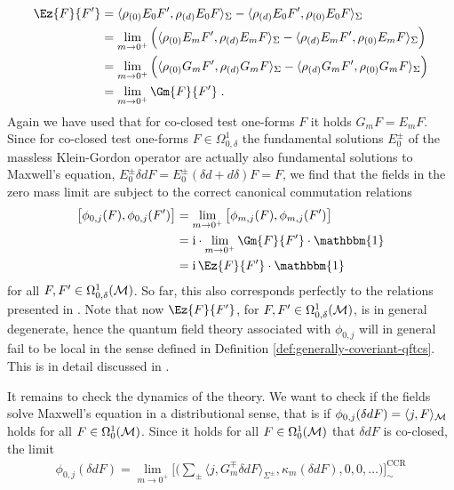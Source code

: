 \begin{align}
\Ez{F}{F'}
&= \langle \rhoz E_0 F' , \rhod E_0 F  \rangle_\Sigma - \langle  \rhod E_0 F' , \rhoz E_0 F \rangle_\Sigma \notag \\
&= \lim\limits_{m \to 0^+} \Big( \langle \rhoz E_m F' , \rhod E_m F  \rangle_\Sigma - \langle  \rhod E_m F' , \rhoz E_m F \rangle_\Sigma  \Big) \notag \\
&= \lim\limits_{m \to 0^+} \Big( \langle \rhoz G_m F' , \rhod G_m F  \rangle_\Sigma - \langle  \rhod G_m F' , \rhoz G_m F \rangle_\Sigma  \Big) \notag \\
&= \lim\limits_{m \to 0^+}  \Gm{F}{F'} \formspace.
\end{align}
Again we have used that for co-closed test one-forms $F$ it holds $G_m F = E_m F$.
Since for co-closed test one-forms $F \in \Omega^1_{0,\delta}$ the fundamental solutions $E^\pm_0$ of the massless Klein-Gordon operator are actually also fundamental solutions to Maxwell's equation, $E_0^\pm \delta d F = E_0^\pm (\delta d + d \delta) F = F$, we find that the fields in the zero mass limit are subject to the correct canonical commutation relations
\begin{align}
	\big[ \phi_{0,j}(F) ,\phi_{0,j}(F')  \big]
	&= \lim\limits_{m \to 0^+} \big[ \phi_{m,j}(F) ,\phi_{m,j}(F')  \big]  \notag\\
	&=\i \cdot \lim\limits_{m \to 0^+} \Gm{F}{F'}\cdot \mathbbm{1} \notag\\
	&= \i \, \Ez{F}{F'}\cdot \mathbbm{1}
\end{align}
for all $F,F' \in \Omega^1_{0,\delta}(\mathcal{M})$. So far, this also corresponds perfectly to the relations presented in \cite[Definition 4.5]{Sanders}.
Note that now $\Ez{F}{F'}$, for $F,F' \in \Omega^1_{0,\delta}(\mathcal{M})$, is in general degenerate, hence the quantum field theory associated with $\phi_{0,j}$ will in general fail to be local in the sense defined in Definition \ref{def:generally-coveriant-qftcs}. This is in detail discussed in \cite{Sanders}. \par
%
It remains to check the dynamics of the theory. We want to check if the fields solve Maxwell's equation in a distributional sense, that is if $\phi_{0,j}(\delta d F) = \langle j , F\rangle_{\mathcal{M}}$ holds for all $F\in \Omega^1_0(\mathcal{M})$. Since it holds for all $F \in \Omega^1_0(\mathcal{M})$ that $\delta d F$ is co-closed, the limit
\begin{align}
	\phi_{0,j} (\delta d F) =  \lim\limits_{m \to 0^+} \big[\big( \sum_{\pm}\langle j , G_m^\mp \delta d F \rangle_{\Sigma^\pm} , \kappa_m(\delta d F) , 0 , 0, \dots\big)\big]^\text{CCR}_\sim
\end{align}
